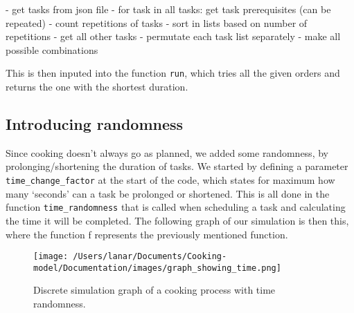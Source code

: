 \begin{verbnobox}
- get tasks from json file
- for task in all tasks:
    get task prerequisites (can be repeated)
- count repetitions of tasks
- sort in lists based on number of repetitions
- get all other tasks
- permutate each task list separately
- make all possible combinations 
\end{verbnobox}

This is then inputed into the function \texttt{run}, which tries all the given orders and returns the one with the shortest duration. 


\subsection{Introducing randomness}
Since cooking doesn't always go as planned, we added some randomness, by prolonging/shortening the duration of tasks. We started by defining a parameter \texttt{time\_change\_factor} at the start of the code, which states for maximum how many `seconds' can a task be prolonged or shortened. 
This is all done in the function \texttt{time\_randomness} that is called when scheduling a task and calculating the time it will be completed. The following graph of our simulation is then this, where the function f represents the previously mentioned function. 

\begin{figure}[H]
    \centerline{\texttt{[image: /Users/lanar/Documents/Cooking-model/Documentation/images/graph\_showing\_time.png]}}
    \caption{Discrete simulation graph of a cooking process with time randomness.}
    \label{fig2}
\end{figure}


